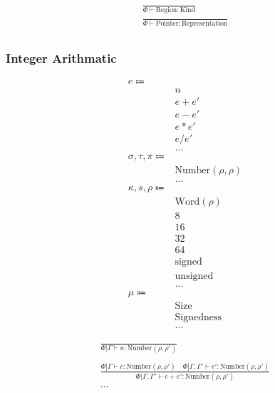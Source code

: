 \documentclass {article}
\begin{document}
\begin{gather*}
\frac
{}
{\Phi \vdash \text{Region} : \text{Kind}} \\
\frac
{}
{\Phi \vdash \text{Pointer} : \text{Representation}} \\
\end{gather*}

\subsubsection{Integer Arithmatic}
\begin{align*}
e \Coloneqq & \\
& n \tag{Numeric Literal} \\
& e + e' \tag{Addition} \\
& e - e' \tag{Subtraction} \\
& e * e' \tag{Multiplication} \\
& e / e' \tag{Division} \\
& \dots \\
\sigma, \tau, \pi \Coloneqq & \\
& \text{Number} (\rho, \rho) \tag{Number} \\
& \dots \\
\kappa, s, \rho \Coloneqq & \\
& \text{Word} (\rho) \tag{Word Representation} \\
& 8 \tag{Byte Size} \\
& 16 \tag{Short Size} \\
& 32 \tag{Int Size} \\
& 64 \tag{Long Size} \\
& \text{signed} \tag{Signed} \\
& \text{unsigned} \tag{Unsigned} \\
& \dots \\
\mu \Coloneqq & \\
& \text{Size} \\
& \text{Signedness} \\
& \dots
\end{align*}

\begin{gather*}
\frac
{}
{\Phi | \Gamma \vdash n : \text{Number}(\rho, \rho')} \\
\\
\frac
{\Phi | \Gamma \vdash e : \text{Number}(\rho, \rho') \quad \Phi | \Gamma, \Gamma' \vdash e' : \text{Number}(\rho, \rho')}
{\Phi | \Gamma, \Gamma' \vdash e + e' : \text{Number}(\rho, \rho')} \\
\dots
\end{gather*}
\end{document}
